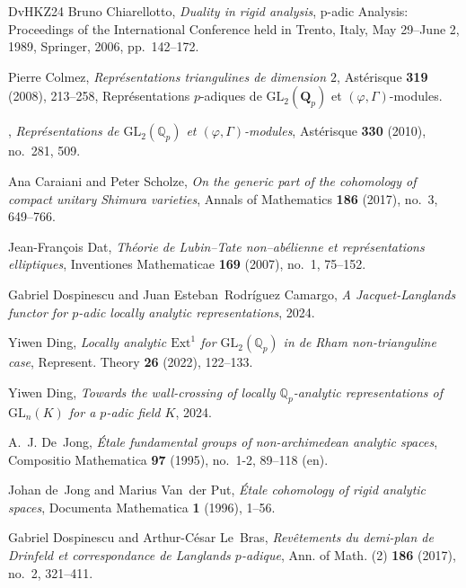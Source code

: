 \documentclass{article}
\theoremstyle{definition}
\begin{document}
\begin{thebibliography}{DvHKZ24}
Bruno Chiarellotto, \emph{Duality in rigid analysis}, p-adic Analysis: Proceedings of the International Conference held in Trento, Italy, May 29--June 2, 1989, Springer, 2006, pp.~142--172.

Pierre Colmez, \emph{Repr{\'e}sentations triangulines de dimension $2$}, Ast{\'e}risque \textbf{319} (2008), 213--258, Repr{\'e}sentations $p$-adiques de $\mathrm{GL}_2(\mathbf{Q}_p)$ et $(\varphi,\Gamma)$-modules.

\bysame, \emph{{Repr{\'e}sentations de $\mathrm{GL}_2(\mathbb{Q}_p)$ et $(\varphi, \Gamma)$-modules}}, Ast{\'e}risque \textbf{330} (2010), no.~281, 509.

Ana Caraiani and Peter Scholze, \emph{{On the generic part of the cohomology of compact unitary Shimura varieties}}, Annals of Mathematics \textbf{186} (2017), no.~3, 649--766.

Jean-Fran{\c{c}}ois Dat, \emph{Th{\'e}orie de {Lubin--Tate} non--ab{\'e}lienne et repr{\'e}sentations elliptiques}, Inventiones Mathematicae \textbf{169} (2007), no.~1, 75--152.

Gabriel Dospinescu and Juan Esteban~Rodríguez Camargo, \emph{{A Jacquet-Langlands functor for $p$-adic locally analytic representations}}, 2024.

Yiwen Ding, \emph{{Locally analytic {$\mathrm{Ext}^1$} for {$\mathrm{GL}_2(\mathbb{Q}_p)$} in de Rham non-trianguline case}}, Represent. Theory \textbf{26} (2022), 122--133. 

Yiwen Ding, \emph{{Towards the wall-crossing of locally $\mathbb{Q}_p$-analytic representations of $\mathrm{GL}_n(K)$ for a $p$-adic field $K$}}, 2024.

A.~J. De~Jong, \emph{{\'Etale fundamental groups of non-archimedean analytic spaces}}, Compositio Mathematica \textbf{97} (1995), no.~1-2, 89--118 (en). 

Johan de~Jong and Marius Van~der Put, \emph{{\'E}tale cohomology of rigid analytic spaces}, Documenta Mathematica \textbf{1} (1996), 1--56.

Gabriel Dospinescu and Arthur-C\'{e}sar Le~Bras, \emph{Rev\^{e}tements du demi-plan de {D}rinfeld et correspondance de {L}anglands {$p$}-adique}, Ann. of Math. (2) \textbf{186} (2017), no.~2, 321--411. 


\end{thebibliography}
\end{document}
